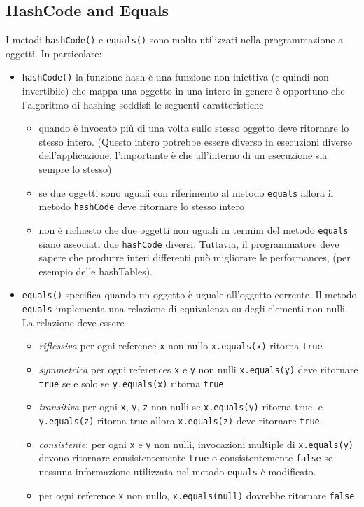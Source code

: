 \documentclass{article}
\begin{document}
\subsection{HashCode and Equals}
I metodi \texttt{hashCode()} e \texttt{equals()} sono molto utilizzati nella programmazione a oggetti. In particolare:
\begin{itemize}
\item \texttt{hashCode()} la funzione hash \`e una funzione non iniettiva (e quindi non invertibile) che mappa una oggetto in una intero in genere \`e opportuno che l'algoritmo di hashing soddisfi le seguenti caratteristiche
\begin{itemize}
\item quando \`e invocato pi\`u di una volta sullo stesso oggetto deve ritornare lo stesso intero. (Questo intero potrebbe essere diverso in esecuzioni diverse dell'applicazione, l'importante \`e che all'interno di un esecuzione sia sempre lo stesso)
\item se due oggetti sono uguali con riferimento al metodo \texttt{equals} allora  il metodo \texttt{hashCode} deve ritornare lo stesso intero
\item non \`e richiesto che due oggetti non uguali in termini del metodo \texttt{equals} siano associati due \texttt{hashCode} diversi. Tuttavia, il programmatore deve sapere che produrre interi differenti pu\`o migliorare le performances, (per esempio delle hashTables).
\end{itemize}
\item \texttt{equals()} specifica quando un oggetto \`e uguale all'oggetto corrente. Il metodo \texttt{equals} implementa una relazione di equivalenza su degli elementi non nulli. La relazione deve essere
\begin{itemize}
\item \emph{riflessiva} per ogni reference \texttt{x} non nullo \texttt{x.equals(x)} ritorna \texttt{true}
\item \emph{symmetrica} per ogni references \texttt{x} e \texttt{y} non nulli \texttt{x.equals(y)} deve ritornare \texttt{true} se e solo se \texttt{y.equals(x)} ritorna \texttt{true}
\item \emph{transitiva} per ogni \texttt{x}, \texttt{y}, \texttt{z} non nulli se \texttt{x.equals(y)} ritorna true, e \texttt{y.equals(z)} ritorna true allora \texttt{x.equals(z)} deve ritornare \texttt{true}.
\item \emph{consistente}: per ogni \texttt{x} e \texttt{y} non nulli, invocazioni multiple di \texttt{x.equals(y)} devono ritornare consistentemente \texttt{true} o consistentemente \texttt{false} se nessuna informazione utilizzata nel metodo \texttt{equals} \`e modificato.
\item per ogni reference \texttt{x} non nullo, \texttt{x.equals(null)} dovrebbe ritornare \texttt{false}
\end{itemize}
\end{itemize}
\end{document}
